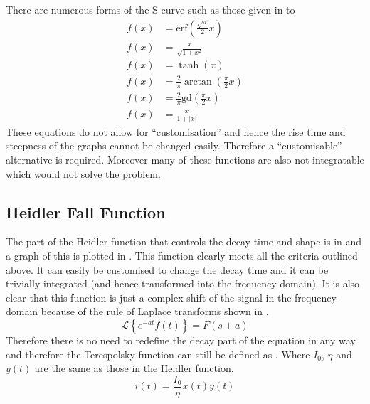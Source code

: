 There are numerous forms of the S-curve such as those given in  to 
\begin{subequations}
    \label{eqn:scurve}
    \begin{align}
        f(x) & = \mathrm{erf} \left ( \frac{\sqrt{\pi}}{2}x \right ) \label{eqn:erf} \\
        f(x) & = \frac{x}{\sqrt{1+x^2}} \label{eqn:sqrt} \\
        f(x) & = \tanh(x) \label{eqn:tanh} \\
        f(x) & = \frac{2}{\pi}\arctan \left ( \frac{\pi}{2}x \right ) \label{eqn:atan} \\
        f(x) & = \frac{2}{\pi}\mathrm{gd} \left ( \frac{\pi}{2}x \right ) \label{eqn:gd} \\
        f(x) & = \frac{x}{1+|x|} \label{eqn:abs}
    \end{align}
\end{subequations}
These equations do not allow for ``customisation'' and hence the rise time and steepness of the graphs cannot be changed easily. Therefore a ``customisable'' alternative is required. Moreover many of these functions are also not integratable which would not solve the problem.



\subsection{Heidler Fall Function}
\label{sub:heidler_fall_function}

The part of the Heidler function that controls the decay time and shape is in  and a graph of this is plotted in . This function clearly meets all the criteria outlined above. It can easily be customised to change the decay time and it can be trivially integrated (and hence transformed into the frequency domain).
It is also clear that this function is just a complex shift of the signal in the frequency domain because of the rule of Laplace transforms shown in  \cite{bkSST,bkControl}.
\begin{equation}
    \mathcal{L} \left \{ e^{-at}f\left ( t \right ) \right \} = F \left (s + a \right )
    \label{eqn:laplaceComplexShift}
\end{equation}
Therefore there is no need to redefine the decay part of the equation in any way and therefore the Terespolsky function can still be defined as . Where $I_0$, $\eta$ and $y(t)$ are the same as those in the Heidler function.
\begin{equation}
i(t) = \frac{I_0}{\eta} x \left( t \right) y \left( t \right)
\label{eqn:PreTFSmall}
\end{equation}

